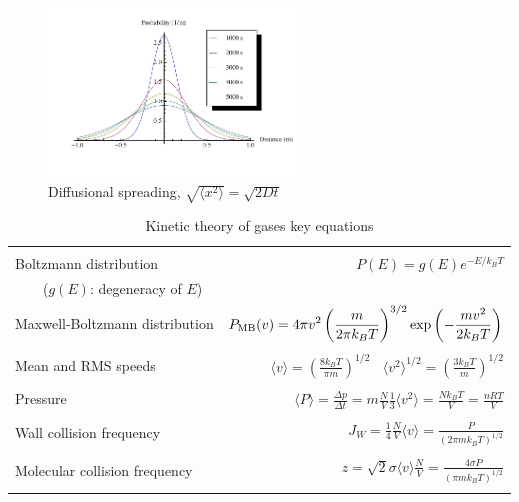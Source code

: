 \documentclass[11pt]{article}
\begin{document}
\begin{figure}[htbp]
\centering
\includegraphics[width=0.6\textwidth]{./Images/Diffusion.pdf}
\caption{Diffusional spreading, \(\sqrt{\langle x^2 \rangle} = \sqrt{2 D t}\)}
\end{figure}

\begin{table} 
\begin{center}
    \caption{Kinetic theory of gases key equations}
    \begin{tabular}{|lr|}
     \hline
 & \\
Boltzmann distribution & $\displaystyle P(E) = g(E) e^{-E/k_BT}$ \\ \ \ \ \ ($g(E)$: degeneracy of
$E$) & \\ 
Maxwell-Boltzmann distribution & $ \displaystyle
P_{\rm MB}(v) = 4\pi v^2 \left( \frac{m}{2\pi k_B T}\right)^{3/2}\exp\left(-\frac{m
    v^2}{2k_B T}\right) $ \\  & \\
Mean and RMS speeds & 

$\displaystyle \langle v \rangle = \left( \frac{8 k_B T}{\pi m} \right)^{1/2} \ \ \ \ \langle v^2
\rangle^{1/2} = \left( \frac{3 k_B T}{m} \right)^{1/2} $ \\  & \\

Pressure & $
\displaystyle \langle P \rangle = \frac{\Delta p}{\Delta t} = m \frac{N}{V}\frac{1}{3}\langle v^2
\rangle = \frac{N k_B T}{V}=\frac{n R T}{V} $ \\ & \\ 

Wall collision frequency &
$ \displaystyle  J_W = \frac{1}{4}\frac{N}{V}\langle v \rangle=\frac{P}{\left( 2 \pi m k_B
    T\right)^{1/2}} $ \\ & \\

Molecular collision frequency &
$ \displaystyle  z=\sqrt{2} \sigma \langle v \rangle\frac{N}{V} = \frac{4\sigma P}{\left( \pi m k_B T
  \right)^{1/2}} $ \\ & \\


\end{tabular}
\end{center}
\end{table}
\end{document}
